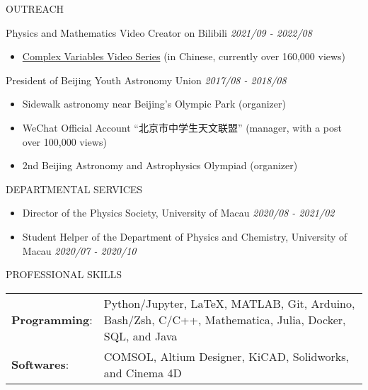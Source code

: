 \documentclass[11pt]{article} %
\begin{document}
\begin{section}{OUTREACH}

Physics and Mathematics Video Creator on Bilibili \hfill \textit{2021/09 - 2022/08}
\begin{itemize}[leftmargin=1.5em]
    \item \href{https://www.bilibili.com/video/BV1th411W7xu/}{Complex Variables Video Series} (in Chinese, currently over 160,000 views) 
\end{itemize}

President of Beijing Youth Astronomy Union \hfill \textit{2017/08 - 2018/08} 
\begin{itemize}[leftmargin=1.5em]
    \item Sidewalk astronomy near Beijing's Olympic Park (organizer)
    \item WeChat Official Account ``北京市中学生天文联盟'' (manager, with a post over 100,000 views)
    \item 2nd Beijing Astronomy and Astrophysics Olympiad (organizer) 
\end{itemize}

\end{section}

\begin{section}{DEPARTMENTAL SERVICES}
    
\begin{itemize}[leftmargin=1.5em]
    \item Director of the Physics Society, University of Macau \hfill \textit{2020/08 - 2021/02}
    \item Student Helper of the Department of Physics and Chemistry, University of Macau \hfill \textit{2020/07 - 2020/10} 
\end{itemize}

\end{section}




\begin{section}{PROFESSIONAL SKILLS}

\begin{tabular}{@{}p{0.2\linewidth}@{}p{0.8\linewidth}@{}}
    \textbf{Programming}: & Python/Jupyter, \LaTeX, MATLAB, Git, Arduino, Bash/Zsh, C/C++, Mathematica, Julia, Docker, SQL, and Java \\
    \textbf{Softwares}: & COMSOL, Altium Designer, KiCAD, Solidworks, and Cinema 4D \\
\end{tabular}
    
\end{section} 
\end{document}
